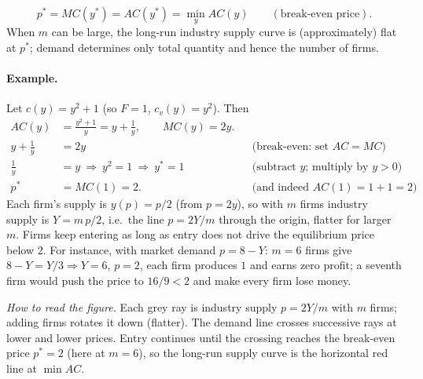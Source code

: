\begin{keybox}[title=Long-run competitive equilibrium with free entry]
\[
p^*=MC(y^*)=AC(y^*)=\min_y AC(y)\qquad(\text{break-even price}).
\]
When $m$ can be large, the long-run industry supply curve is (approximately) flat at $p^*$; demand determines only total quantity and hence the number of firms.
\end{keybox}

\paragraph{Example.} Let $c(y)=y^2+1$ (so $F=1$, $c_v(y)=y^2$). Then
\begin{align*}
AC(y)&=\frac{y^2+1}{y}=y+\frac1y, \qquad MC(y)=2y.\\
y+\frac1y&=2y &&\text{(break-even: set $AC=MC$)}\\
\frac1y&=y\ \Longrightarrow\ y^2=1\ \Longrightarrow\ y^*=1 &&\text{(subtract $y$; multiply by $y>0$)}\\
p^*&=MC(1)=2. &&\text{(and indeed $AC(1)=1+1=2$)}
\end{align*}
Each firm's supply is $y(p)=p/2$ (from $p=2y$), so with $m$ firms industry supply is $Y=m\,p/2$, i.e.\ the line $p=2Y/m$ through the origin, flatter for larger $m$. Firms keep entering as long as entry does not drive the equilibrium price below $2$. For instance, with market demand $p=8-Y$: $m=6$ firms give $8-Y=Y/3\Rightarrow Y=6$, $p=2$, each firm produces $1$ and earns zero profit; a seventh firm would push the price to $16/9<2$ and make every firm lose money.

\begin{center}
\end{center}
\textit{How to read the figure.} Each grey ray is industry supply $p=2Y/m$ with $m$ firms; adding firms rotates it down (flatter). The demand line crosses successive rays at lower and lower prices. Entry continues until the crossing reaches the break-even price $p^*=2$ (here at $m=6$), so the long-run supply curve is the horizontal red line at $\min AC$.

